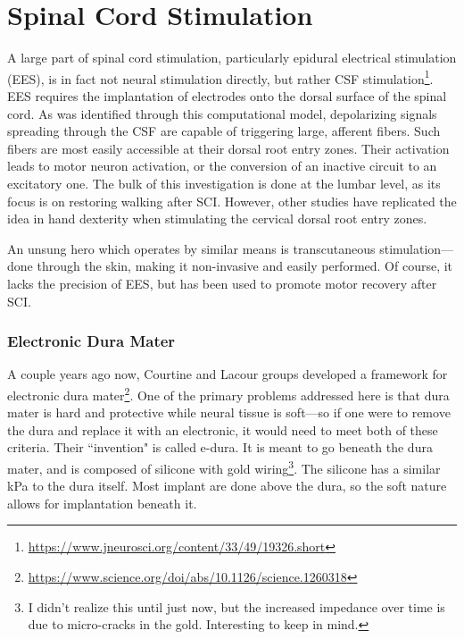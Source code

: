 \chapter{Spinal Cord Stimulation}

\label{sec:SpinalCordStimulation}

A large part of spinal cord stimulation, particularly epidural electrical stimulation (EES), is in fact not neural stimulation directly, but rather CSF stimulation\footnote{\url{https://www.jneurosci.org/content/33/49/19326.short}}. EES requires the implantation of electrodes onto the dorsal surface of the spinal cord. As was identified through this computational model, depolarizing signals spreading through the CSF are capable of triggering large, afferent fibers. Such fibers are most easily accessible at their dorsal root entry zones. Their activation leads to motor neuron activation, or the conversion of an inactive circuit to an excitatory one. The bulk of this investigation is done at the lumbar level, as its focus is on restoring walking after SCI. However, other studies have replicated the idea in hand dexterity when stimulating the cervical dorsal root entry zones.\newline

An unsung hero which operates by similar means is transcutaneous stimulation---done through the skin, making it non-invasive and easily performed. Of course, it lacks the precision of EES, but has been used to promote motor recovery after SCI. 


\subsection{Electronic Dura Mater}

A couple years ago now, Courtine and Lacour groups developed a framework for electronic dura mater\footnote{\url{https://www.science.org/doi/abs/10.1126/science.1260318}}. One of the primary problems addressed here is that dura mater is hard and protective while neural tissue is soft---so if one were to remove the dura and replace it with an electronic, it would need to meet both of these criteria. Their ``invention" is called e-dura. It is meant to go beneath the dura mater, and is composed of silicone with gold wiring\footnote{I didn't realize this until just now, but the increased impedance over time is due to micro-cracks in the gold. Interesting to keep in mind.}. The silicone has a similar kPa to the dura itself. Most implant are done above the dura, so the soft nature allows for implantation beneath it.\newline

